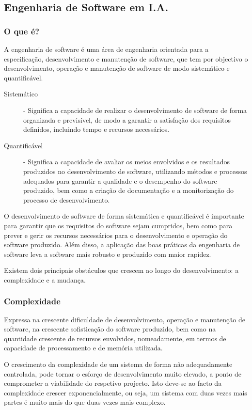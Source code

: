 \documentclass[a4paper,12pt]{article}
\begin{document}
\newpage
\subsection{Engenharia de Software em I.A.} \label{engenharia_de_software_em_ia}
\subsubsection{O que é?} \label{o_que_e}
A engenharia de software é uma área de engenharia orientada para a especificação, desenvolvimento e manutenção de software, que tem por objectivo o desenvolvimento, operação e manutenção de software de modo sistemático e quantificável.
\begin{description}
	\item[Sistemático] - Significa a capacidade de realizar o desenvolvimento de software de forma organizada e previsível, de modo a garantir a satisfação dos requisitos definidos, incluindo tempo e recursos necessários.
	\item[Quantificável] - Significa a capacidade de avaliar os meios envolvidos e os resultados produzidos no desenvolvimento de software, utilizando métodos e processos adequados para garantir a qualidade e o desempenho do software produzido, bem como a criação de documentação e a monitorização do processo de desenvolvimento.
\end{description}

O desenvolvimento de software de forma sistemática e quantificável é importante para garantir que os requisitos do software sejam cumpridos, bem como para prever e gerir os recursos necessários para o desenvolvimento e operação do software produzido.
Além disso, a aplicação das boas práticas da engenharia de software leva a software mais robusto e produzido com maior rapidez.

Existem dois principais obstáculos que crescem ao longo do desenvolvimento: a complexidade e a mudança.
\subsubsection{Complexidade} \label{complexidade}
Expressa na crescente dificuldade de desenvolvimento, operação e manutenção de software, na crescente sofisticação do software produzido, bem como na quantidade crescente de recursos envolvidos, nomeadamente, em termos de capacidade de processamento e de memória utilizada.

O crescimento da complexidade de um sistema de forma não adequadamente controlada, pode tornar o esforço de desenvolvimento muito elevado, a ponto de comprometer a viabilidade do respetivo projecto. Isto deve-se ao facto da complexidade crescer exponencialmente, ou seja, um sistema com duas vezes mais partes é muito mais do que duas vezes mais complexo.
\end{document}

